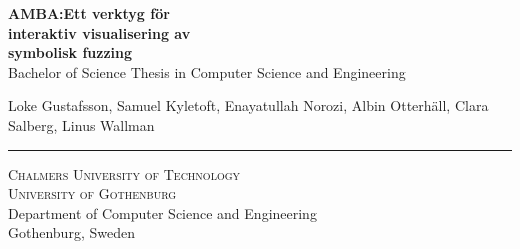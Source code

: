 
\mbox{}
\vfill
\textbf{{\Huge AMBA:\@ Ett verktyg för \\ interaktiv visualisering av \\ symbolisk fuzzing}} \\[0.5cm]
Bachelor of Science Thesis in Computer Science and Engineering \setlength{\parskip}{1cm}

\noindent
{\Large Loke Gustafsson, Samuel Kyletoft, Enayatullah Norozi, Albin Otterhäll,
	Clara Salberg, Linus Wallman} \setlength{\parskip}{1.5cm}


\rule{\textwidth}{1pt}
\textsc{Chalmers University of Technology} \\
\textsc{University of Gothenburg} \\
{\small Department of Computer Science and Engineering} \\
{\small Gothenburg, Sweden \the\year} \\
